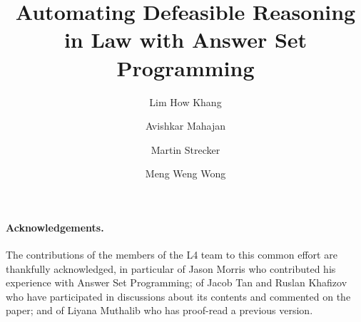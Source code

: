 \documentclass[runningheads]{llncs}
\begin{document}


\title{Automating Defeasible Reasoning in Law with Answer Set Programming}

\author{
Lim How Khang \and
Avishkar Mahajan \and
Martin Strecker \and
Meng Weng Wong
}


\maketitle

\begin{abstract}

\end{abstract}






% 



%





\paragraph{Acknowledgements.}
The contributions of the members of the L4 team to this common effort are
thankfully acknowledged, in particular of Jason Morris who contributed his
experience with Answer Set Programming; of Jacob Tan and Ruslan Khafizov who
have participated in discussions about its contents and commented on the
paper; and of Liyana Muthalib who has proof-read a previous version.
\end{document}

